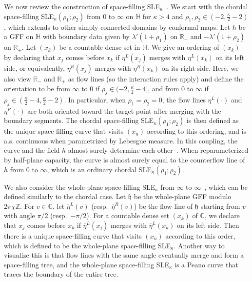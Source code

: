 \documentclass[a4paper]{article}
\numberwithin{equation}{section}
\numberwithin{equation}{section}
\renewcommand{\1}{\mathbf{1}}
\begin{document}
We now review the construction of space-filling SLE$_\kappa$~\cite{IG4}. We start with the chordal space-filling SLE$_\kappa(\rho_1;\rho_2)$ from 0 to $\infty$ on $\mathbb H$ for $\kappa>4$ and $\rho_1,\rho_2 \in (-2,\frac{\kappa}{2}-2)$, which extends to other simply connected domains by conformal maps. Let $h$ be a GFF on $\mathbb H$ with boundary data given by $\lambda'(1+\rho_1)$ on $\mathbb R_-$ and $-\lambda'(1+\rho_2)$ on $\mathbb R_+$. Let $(x_k)$ be a countable dense set in $\mathbb H$. We give an ordering of $(x_k)$ by declaring that $x_j$ comes before $x_k$ if $\eta^L(x_j)$ merges with $\eta^L(x_k)$ on its left side, or equivalently, $\eta^R(x_j)$ merges with $\eta^R(x_k)$ on its right side. Here, we also view $\mathbb R_-$ and $\mathbb R_+$ as flow lines (so the interaction rules apply) and define the orientation to be from $\infty$ to 0 if $\rho_j \in (-2,\frac{\kappa}{2}-4]$, and from 0 to $\infty$ if $\rho_j \in (\frac{\kappa}{2}-4,\frac{\kappa}{2}-2)$. In particular, when $\rho_1=\rho_2=0$, the flow lines $\eta^L(\cdot)$ and $\eta^R(\cdot)$ are both oriented toward the target point after merging with the boundary segments. The chordal space-filling SLE$_\kappa(\rho_1;\rho_2)$ is then defined as the unique space-filling curve that visits $(x_n)$ according to this ordering, and is a.s. continuous when parametrized by Lebesgue measure. In this coupling, the curve and the field $h$ almost surely determine each other~\cite[Theorem 1.16]{IG4}. When reparameterized by half-plane capacity, the curve is almost surely equal to the counterflow line of $h$ from 0 to $\infty$, which is an ordinary chordal SLE$_\kappa(\rho_1;\rho_2)$.

We also consider the whole-plane space-filling SLE$_\kappa$ from $\infty$ to $\infty$~\cite[Section 1.4.1]{DMS21-LQG-MRT}, which can be defined similarly to the chordal case. Let $\mathfrak h$ be the whole-plane GFF modulo $2\pi\chi \mathbb Z$. For $v \in \mathbb C$, let $\overline\eta^L(v)$ (resp.\ $\overline\eta^R(v)$) be the flow line of $\mathfrak h$ starting from $v$ with angle $\pi/2$ (resp.\ $-\pi/2$). For a countable dense set $(x_k)$ of $\mathbb C$, we declare that $x_j$ comes before $x_k$ if $\overline\eta^L(x_j)$ merges with $\overline\eta^L(x_k)$ on its left side. Then there is a unique space-filling curve that visits $(x_n)$ according to this order, which is defined to be the whole-plane space-filling SLE$_\kappa$. Another way to visualize this is that flow lines with the same angle eventually merge and form a space-filling tree, and the whole-plane space-filling SLE$_\kappa$ is a Peano curve that traces the boundary of the entire tree.
\end{document}
